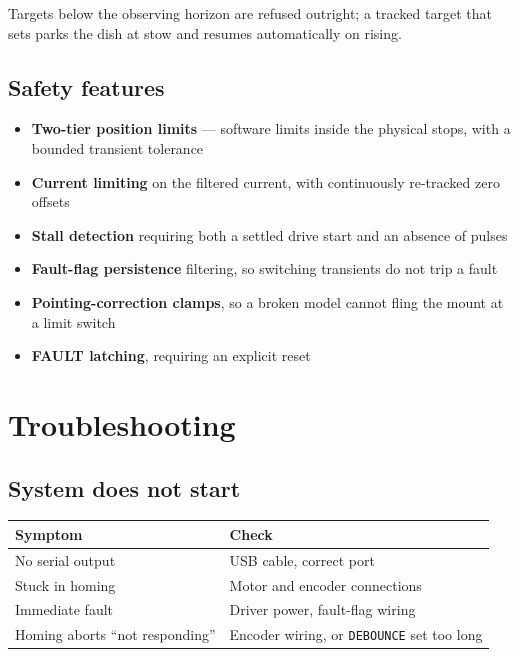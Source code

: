 \documentclass[11pt,a4paper]{article}
\begin{document}
Targets below the observing horizon are refused outright; a tracked target that sets parks the dish at stow and resumes automatically on rising.

\subsection{Safety features}

\begin{itemize}
    \item \textbf{Two-tier position limits} --- software limits inside the physical stops, with a bounded transient tolerance
    \item \textbf{Current limiting} on the filtered current, with continuously re-tracked zero offsets
    \item \textbf{Stall detection} requiring both a settled drive start and an absence of pulses
    \item \textbf{Fault-flag persistence} filtering, so switching transients do not trip a fault
    \item \textbf{Pointing-correction clamps}, so a broken model cannot fling the mount at a limit switch
    \item \textbf{FAULT latching}, requiring an explicit reset
\end{itemize}

\section{Troubleshooting}
\label{sec:troubleshooting}

\subsection{System does not start}

\begin{table}[H]
\centering
\small
\begin{tabular}{p{5.4cm}p{9.2cm}}
\toprule
\textbf{Symptom} & \textbf{Check} \\
\midrule
No serial output & USB cable, correct port \\
Stuck in homing & Motor and encoder connections \\
Immediate fault & Driver power, fault-flag wiring \\
Homing aborts ``not responding'' & Encoder wiring, or \texttt{DEBOUNCE} set too long \\
\bottomrule
\end{tabular}
\end{table}
\end{document}
